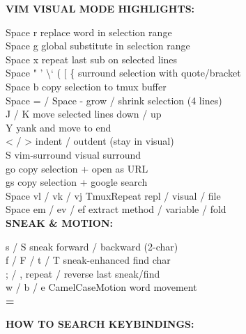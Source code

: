 \documentclass[11pt,a4paper,twoside]{book}
\begin{document}
\vspace{12pt}
{\bfseries\color{neonyellow} VIM \textbf{VISUAL} MODE HIGHLIGHTS:}\vspace{4pt}

Space r               replace word in selection range\\
Space g               global substitute in selection range\\
Space x               repeat last sub on selected lines\\
Space " ' \textbackslash{}` ( [ \{    surround selection with quote/bracket\\
Space b               copy selection to tmux buffer\\
Space = / Space -     grow / shrink selection (4 lines)\\
J / K                move selected lines down / up\\
Y                     yank and move to end\\
< / >                indent / outdent (stay in visual)\\
S                     vim-surround visual surround\\
go                    copy selection + open as URL\\
gs                    copy selection + google search\\
Space vl / vk / vj   TmuxRepeat repl / visual / file\\
Space em / ev / ef   extract method / variable / fold\\


\vspace{12pt}
{\bfseries\color{neonyellow} SNEAK \& MOTION:}\vspace{4pt}

s / S                sneak forward / backward (2-char)\\
f / F / t / T        sneak-enhanced find char\\
; / ,                repeat / reverse last sneak/find\\
w / b / e            CamelCaseMotion word movement\\


\vspace{10pt}
{\large\bfseries\color{neoncyan} =}\vspace{6pt}


\vspace{12pt}
{\bfseries\color{neonyellow} HOW TO SEARCH KEYBINDINGS:}\vspace{4pt}
\end{document}

